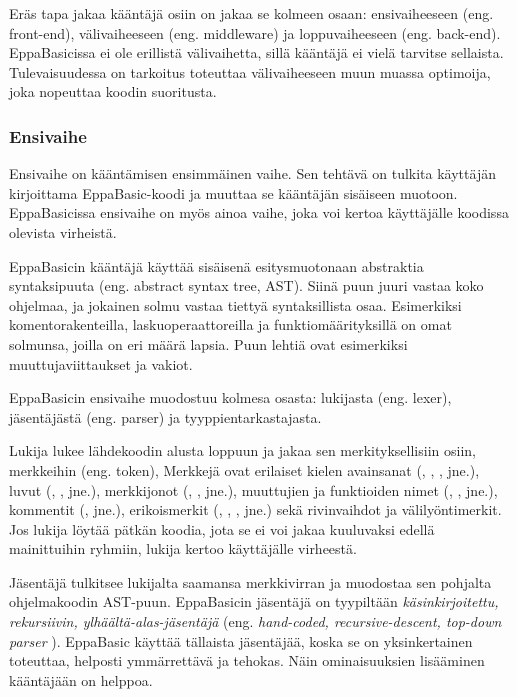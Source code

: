 Eräs tapa jakaa kääntäjä osiin on jakaa
se kolmeen osaan:
ensivaiheeseen (eng. front-end),
välivaiheeseen (eng. middleware) ja
loppuvaiheeseen (eng. back-end).
EppaBasicissa ei ole erillistä välivaihetta,
sillä kääntäjä ei vielä tarvitse sellaista.
Tulevaisuudessa on tarkoitus toteuttaa
välivaiheeseen muun muassa optimoija,
joka nopeuttaa koodin suoritusta.

\subsubsection{Ensivaihe}
Ensivaihe on kääntämisen ensimmäinen vaihe.
Sen tehtävä on tulkita käyttäjän kirjoittama
EppaBasic-koodi ja muuttaa se kääntäjän
sisäiseen muotoon.
EppaBasicissa ensivaihe on myös ainoa
vaihe, joka voi kertoa käyttäjälle
koodissa olevista virheistä.

EppaBasicin kääntäjä käyttää sisäisenä
esitysmuotonaan abstraktia syntaksipuuta
(eng. abstract syntax tree, AST).
Siinä puun juuri vastaa koko ohjelmaa,
ja jokainen solmu vastaa tiettyä
syntaksillista osaa.
Esimerkiksi komentorakenteilla,
laskuoperaattoreilla ja
funktiomäärityksillä
on omat solmunsa, joilla on eri määrä lapsia.
Puun lehtiä ovat esimerkiksi
muuttujaviittaukset ja vakiot.

EppaBasicin ensivaihe muodostuu
kolmesa osasta:
lukijasta (eng. lexer),
jäsentäjästä (eng. parser) ja
tyyppientarkastajasta.

Lukija lukee lähdekoodin alusta loppuun
ja jakaa sen merkityksellisiin osiin,
merkkeihin (eng. token),
Merkkejä ovat erilaiset kielen
avainsanat (, , , jne.),
luvut (, , jne.),
merkkijonot (, , jne.),
muuttujien ja funktioiden nimet (, , jne.),
kommentit (, jne.),
erikoismerkit (\eb{+}, \eb{-}, \eb{^}, jne.) sekä
rivinvaihdot ja välilyöntimerkit.
Jos lukija löytää pätkän koodia,
jota se ei voi jakaa kuuluvaksi
edellä mainittuihin ryhmiin,
lukija kertoo käyttäjälle virheestä.

Jäsentäjä tulkitsee lukijalta saamansa
merkkivirran ja muodostaa sen pohjalta
ohjelmakoodin AST-puun.
EppaBasicin jäsentäjä on tyypiltään
\emph{käsinkirjoitettu, rekursiivin,
ylhäältä-alas-jäsentäjä}
(eng. \emph{hand-coded, recursive-descent,
top-down parser} \cite[kappale 3.3.2]{eac2e}).
EppaBasic käyttää tällaista jäsentäjää,
koska se on yksinkertainen toteuttaa,
helposti ymmärrettävä ja tehokas.
Näin ominaisuuksien lisääminen
kääntäjään on helppoa.

